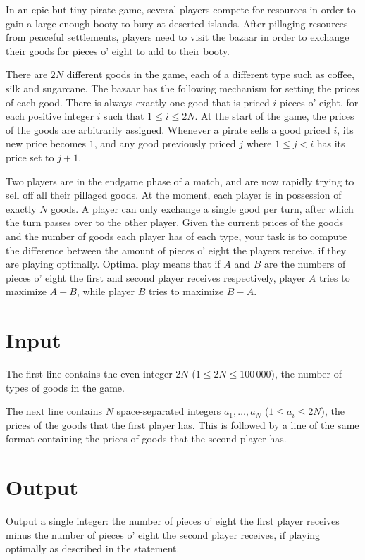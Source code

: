 In an epic but tiny pirate game, several players compete for resources in order to gain a large enough booty to bury at deserted islands.
After pillaging resources from peaceful settlements, players need to visit the bazaar in order to exchange their goods for pieces o' eight to add to their booty.

There are $2N$ different goods in the game, each of a different type such as coffee, silk and sugarcane.
The bazaar has the following mechanism for setting the prices of each good.
There is always exactly one good that is priced $i$ pieces o' eight, for each positive integer $i$ such that $1 \le i \le 2N$.
At the start of the game, the prices of the goods are arbitrarily assigned.
Whenever a pirate sells a good priced $i$, its new price becomes $1$, and any good previously priced $j$ where $1 \le j < i$ has its price set to $j + 1$.

Two players are in the endgame phase of a match, and are now rapidly trying to sell off all their pillaged goods.
At the moment, each player is in possession of exactly $N$ goods.
A player can only exchange a single good per turn, after which the turn passes over to the other player.
Given the current prices of the goods and the number of goods each player has of each type, your task is to compute the difference between the amount of pieces o' eight the players receive, if they are playing optimally.
Optimal play means that if $A$ and $B$ are the numbers of pieces o' eight the first and second player receives respectively, player $A$ tries to maximize $A - B$, while player $B$ tries to maximize $B - A$.

\section*{Input}
The first line contains the even integer $2N$ ($1 \le 2N \le 100\,000$), the number of types of goods in the game.

The next line contains $N$ space-separated integers $a_1, \dots, a_N$ ($1 \le a_i \le 2N$), the prices of the goods that the first player has.
This is followed by a line of the same format containing the prices of goods that the second player has.

\section*{Output}
Output a single integer: the number of pieces o' eight the first player receives minus the number of pieces o' eight the second player receives, if playing optimally as described in the statement.

